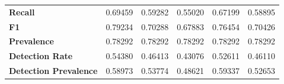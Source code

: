 \documentclass{article}
\begin{document}
\begin{table}[H]
\begin{center}
\begin{tabular}{@{}llllll@{}}
\textbf{Recall}               & 0.69459          & 0.59282           & 0.55020              & 0.67199           & 0.58895           \\
\textbf{F1}                   & 0.79234          & 0.70288           & 0.67883              & 0.76454           & 0.70426           \\
\textbf{Prevalence}           & 0.78292          & 0.78292           & 0.78292              & 0.78292           & 0.78292           \\
\textbf{Detection Rate}       & 0.54380          & 0.46413           & 0.43076              & 0.52611           & 0.46110           \\
\textbf{Detection Prevalence} & 0.58973          & 0.53774           & 0.48621              & 0.59337           & 0.52653           \\
 \bottomrule
\end{tabular}
\end{center}
\end{table}





\end{document}

